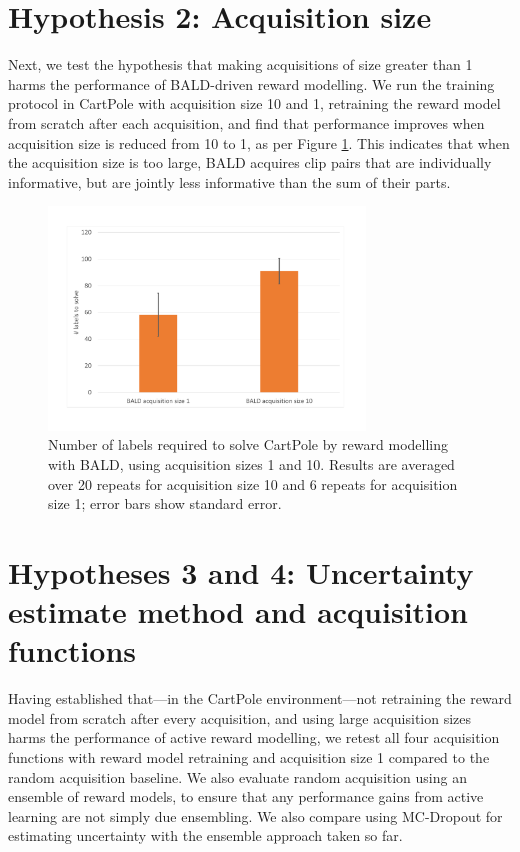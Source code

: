 \documentclass[11pt, a4paper, bibliography=totoc]{report}
\begin{document}
\section{Hypothesis 2: Acquisition size}
Next, we test the hypothesis that making acquisitions of size greater than 1 harms the performance of BALD-driven reward modelling. We run the training protocol in CartPole with acquisition size 10 and 1, retraining the reward model from scratch after each acquisition, and find that performance improves when acquisition size is reduced from 10 to 1, as per Figure \ref{fig:acq_size}. This indicates that when the acquisition size is too large, BALD acquires clip pairs that are individually informative, but are jointly less informative than the sum of their parts.
\begin{figure}[h]
	\centering
	\includegraphics[width=0.75\textwidth]{acq_size}
	\caption{Number of labels required to solve CartPole by reward modelling with BALD, using acquisition sizes 1 and 10. Results are averaged over 20 repeats for acquisition size 10 and 6 repeats for acquisition size 1; error bars show standard error.}
	\label{fig:acq_size}
\end{figure}

\section{Hypotheses 3 and 4: Uncertainty estimate method and acquisition functions}
Having established that---in the CartPole environment---not retraining the reward model from scratch after every acquisition, and using large acquisition sizes harms the performance of active reward modelling, we retest all four acquisition functions with reward model retraining and acquisition size 1 compared to the random acquisition baseline. We also evaluate random acquisition using an ensemble of reward models, to ensure that any performance gains from active learning are not simply due ensembling. We also compare using MC-Dropout for estimating uncertainty with the ensemble approach taken so far.
\end{document}
